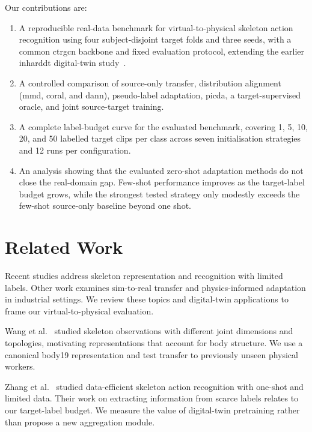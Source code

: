 \documentclass[3p,times,procedia]{elsarticle}
\begin{document}
Our contributions are:
\begin{enumerate}
  \item A reproducible real-data benchmark for virtual-to-physical skeleton
        action recognition using four subject-disjoint target folds and three seeds,
        with a common \ac{ctrgcn} backbone and fixed evaluation protocol, extending
        the earlier \acs{inharddt} digital-twin study~\cite{dallel2023digital}.
  \item A controlled comparison of source-only transfer, distribution alignment
        (\ac{mmd}, \ac{coral}, and \ac{dann}), pseudo-label adaptation, \ac{picda}, a
        target-supervised oracle, and joint source-target training.
  \item A complete label-budget curve for the evaluated benchmark, covering 1, 5, 10,
        20, and 50 labelled target clips per class across seven initialisation
        strategies and 12 runs per configuration.
  \item An analysis showing that the evaluated zero-shot adaptation methods do
        not close the real-domain gap. Few-shot performance improves as the
        target-label budget grows, while the strongest tested strategy only
        modestly exceeds the few-shot source-only baseline beyond one shot.
\end{enumerate}

\section{Related Work}
\label{sec:related}

Recent studies address skeleton representation and recognition with limited
labels. Other work examines sim-to-real transfer and physics-informed adaptation
in industrial settings. We review these topics and digital-twin applications to
frame our virtual-to-physical evaluation.

Wang et al.~\cite{wang2025heterogeneous} studied skeleton observations with
different joint dimensions and topologies, motivating representations that
account for body structure. We use a canonical body19 representation and test
transfer to previously unseen physical workers.

Zhang et al.~\cite{zhang2025skeletonx} studied data-efficient skeleton action
recognition with one-shot and limited data. Their work on extracting information
from scarce labels relates to our target-label budget. We measure the value of
digital-twin pretraining rather than propose a new aggregation module.
\end{document}
